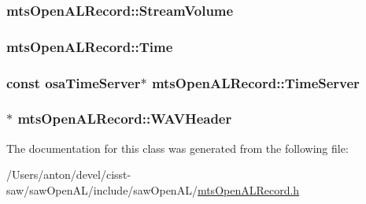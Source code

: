 \subsubsection[{Stream\+Volume}]{ mts\+Open\+A\+L\+Record\+::\+Stream\+Volume\hspace{0.3cm}{\ttfamily [protected]}}\label{classmts_open_a_l_record_a36e814f3bb80ef27231bebaabca3f75d}
\hypertarget{classmts_open_a_l_record_af6104f48da53ce5733a1a888520d38a1}{}
\subsubsection[{Time}]{ mts\+Open\+A\+L\+Record\+::\+Time\hspace{0.3cm}{\ttfamily [protected]}}\label{classmts_open_a_l_record_af6104f48da53ce5733a1a888520d38a1}
\hypertarget{classmts_open_a_l_record_a91de11a3551290c23f912ebe998981ca}{}
\subsubsection[{Time\+Server}]{\setlength{\rightskip}{0pt plus 5cm}const {\bf osa\+Time\+Server}$\ast$ mts\+Open\+A\+L\+Record\+::\+Time\+Server\hspace{0.3cm}{\ttfamily [protected]}}\label{classmts_open_a_l_record_a91de11a3551290c23f912ebe998981ca}
\hypertarget{classmts_open_a_l_record_ad185524b5a93f8e920b57db367ff01c6}{}
\subsubsection[{W\+A\+V\+Header}]{$\ast$ mts\+Open\+A\+L\+Record\+::\+W\+A\+V\+Header\hspace{0.3cm}{\ttfamily [protected]}}\label{classmts_open_a_l_record_ad185524b5a93f8e920b57db367ff01c6}


The documentation for this class was generated from the following file\+:\begin{DoxyCompactItemize}
\item 
/\+Users/anton/devel/cisst-\/saw/saw\+Open\+A\+L/include/saw\+Open\+A\+L/\hyperlink{mts_open_a_l_record_8h}{mts\+Open\+A\+L\+Record.\+h}\end{DoxyCompactItemize}
